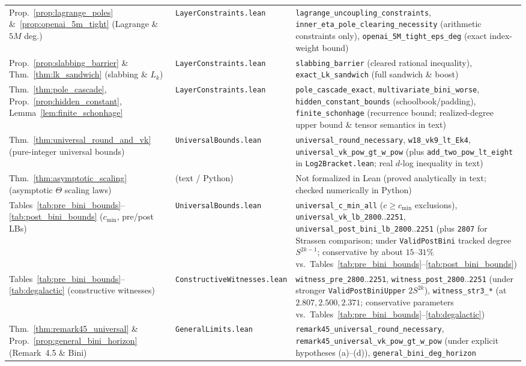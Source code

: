 \documentclass[11pt,a4paper]{article}
\theoremstyle{plain}
\theoremstyle{definition}
\theoremstyle{remark}
\begin{document}
\begin{landscape}
\begin{table}[!htbp]
\begin{tabular}{@{} >{\raggedright\arraybackslash}p{6.0cm} l >{\raggedright\arraybackslash}p{13.4cm} @{}}
Prop.~\ref{prop:lagrange_poles} \&~\ref{prop:openai_5m_tight} (Lagrange \& $5M$ deg.) & \texttt{LayerConstraints.lean} & \texttt{lagrange\_uncoupling\_constraints}, \texttt{inner\_eta\_pole\_clearing\_necessity} (arithmetic constraints only), \texttt{openai\_5M\_tight\_eps\_deg} (exact index-weight bound) \\
Prop.~\ref{prop:slabbing_barrier} \& Thm.~\ref{thm:lk_sandwich} (slabbing \& $L_k$) & \texttt{LayerConstraints.lean} & \texttt{slabbing\_barrier} (cleared rational inequality), \texttt{exact\_Lk\_sandwich} (full sandwich \& boost) \\
Thm.~\ref{thm:pole_cascade}, Prop.~\ref{prop:hidden_constant}, Lemma~\ref{lem:finite_schonhage} & \texttt{LayerConstraints.lean} & \texttt{pole\_cascade\_exact}, \texttt{multivariate\_bini\_worse}, \texttt{hidden\_constant\_bounds} (schoolbook/padding), \texttt{finite\_schonhage} (recurrence bound; realized-degree upper bound \& tensor semantics in text) \\
Thm.~\ref{thm:universal_round_and_vk} (pure-integer universal bounds) & \texttt{UniversalBounds.lean} & \texttt{universal\_round\_necessary}, \texttt{w18\_vk9\_lt\_Ek4}, \texttt{universal\_vk\_pow\_gt\_w\_pow} (plus \texttt{add\_two\_pow\_lt\_eight} in \texttt{Log2Bracket.lean}; real $d$-log inequality in text) \\
Thm.~\ref{thm:asymptotic_scaling} (asymptotic $\Theta$ scaling laws) & (text / Python) & Not formalized in Lean (proved analytically in text; checked numerically in Python) \\
Tables~\ref{tab:pre_bini_bounds}--\ref{tab:post_bini_bounds} ($c_{\min}$, pre/post LBs) & \texttt{UniversalBounds.lean} & \texttt{universal\_c\_min\_all} ($c \ge c_{\min}$ exclusions), \texttt{universal\_vk\_lb\_2800}..\texttt{2251}, \texttt{universal\_post\_bini\_lb\_2800}..\texttt{2251} (plus \texttt{2807} for Strassen comparison; under \texttt{ValidPostBini} tracked degree $S^{2k-1}$; conservative by about $15$--$31\%$ vs.\ Tables~\ref{tab:pre_bini_bounds}--\ref{tab:post_bini_bounds}) \\
Tables~\ref{tab:pre_bini_bounds}--\ref{tab:degalactic} (constructive witnesses) & \texttt{ConstructiveWitnesses.lean} & \texttt{witness\_pre\_2800}..\texttt{2251}, \texttt{witness\_post\_2800}..\texttt{2251} (under stronger \texttt{ValidPostBiniUpper} $2 S^{2k}$), \texttt{witness\_str3\_*} (at $2.807, 2.500, 2.371$; conservative parameters vs.\ Tables~\ref{tab:pre_bini_bounds}--\ref{tab:degalactic}) \\
Thm.~\ref{thm:remark45_universal} \& Prop.~\ref{prop:general_bini_horizon} (Remark~4.5 \& Bini) & \texttt{GeneralLimits.lean} & \texttt{remark45\_universal\_round\_necessary}, \texttt{remark45\_universal\_vk\_pow\_gt\_w\_pow} (under explicit hypotheses (a)--(d)), \texttt{general\_bini\_deg\_horizon} \\

\end{tabular}
\end{table}
\end{landscape}
\end{document}
